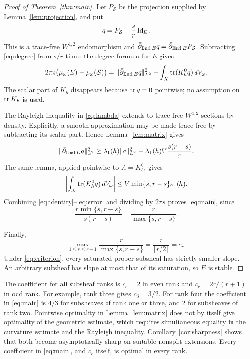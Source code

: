 \begin{proof}[Proof of Theorem~\ref{thm:main}]
Let $P_{\mathcal S}$ be the projection supplied by Lemma~\ref{lem:projection}, and
put
\[
 q=P_{\mathcal S}-\frac{s}{r}\operatorname{Id}_E.
\]
This is a trace-free $W^{1,2}$ endomorphism and
$\bar\partial_{\operatorname{End} E}q=\bar\partial_{\operatorname{End} E}P_{\mathcal S}$. Subtracting
\eqref{eq:degree} from $s/r$ times the degree formula for $E$ gives
\begin{equation}\label{eq:identity}
 2\pi s\bigl(\mu_\omega(E)-\mu_\omega(\mathcal S)\bigr)
 =\lVert\bar\partial_{\operatorname{End} E}q\rVert_{L^2}^2
  -\int_X\operatorname{tr}(K_h^0q)\,dV_\omega.
\end{equation}
The scalar part of $K_h$ disappears because $\operatorname{tr} q=0$ pointwise;
no assumption on $\operatorname{tr} K_h$ is used.

The Rayleigh inequality in \eqref{eq:lambda} extends to trace-free
$W^{1,2}$ sections by density. Explicitly, a smooth approximation may
be made trace-free by subtracting its scalar part. Hence
Lemma~\ref{lem:matrix} gives
\begin{equation}\label{eq:rayleigh}
 \lVert\bar\partial_{\operatorname{End} E}q\rVert_{L^2}^2
 \ge\lambda_1(h)\lVert q\rVert_{L^2}^2
 =\lambda_1(h)V\frac{s(r-s)}{r}.
\end{equation}
The same lemma, applied pointwise to $A=K_h^0$, gives
\begin{equation}\label{eq:error}
 \left|\int_X\operatorname{tr}(K_h^0q)\,dV_\omega\right|
 \le V\min\{s,r-s\}\varepsilon_1(h).
\end{equation}
Combining \eqref{eq:identity}--\eqref{eq:error} and dividing by
$2\pi s$ proves \eqref{eq:main}, since
\[
 \frac{r\min\{s,r-s\}}{s(r-s)}
 =\frac{r}{\max\{s,r-s\}}.
\]

Finally,
\[
 \max_{1\le s\le r-1}\frac{r}{\max\{s,r-s\}}
 =\frac{r}{\lceil r/2\rceil}=c_r.
\]
Under \eqref{eq:criterion}, every saturated proper subsheaf has strictly
smaller slope. An arbitrary subsheaf has slope at most that of its
saturation, so $E$ is stable.
\end{proof}

\begin{remark}
The coefficient for all subsheaf ranks is $c_r=2$ in even rank and
$c_r=2r/(r+1)$ in odd rank. For example, rank three gives $c_3=3/2$.
For rank four the coefficient in \eqref{eq:main} is $4/3$ for
subsheaves of rank one or three, and $2$ for subsheaves of rank two.
Pointwise optimality in Lemma~\ref{lem:matrix} does not by itself give
optimality of the geometric estimate, which requires simultaneous equality
in the curvature estimate and the Rayleigh inequality.
Corollary~\ref{cor:sharpness} shows that both become asymptotically sharp on
suitable nonsplit extensions. Every coefficient in \eqref{eq:main}, and
$c_r$ itself, is optimal in every rank.
\end{remark}


